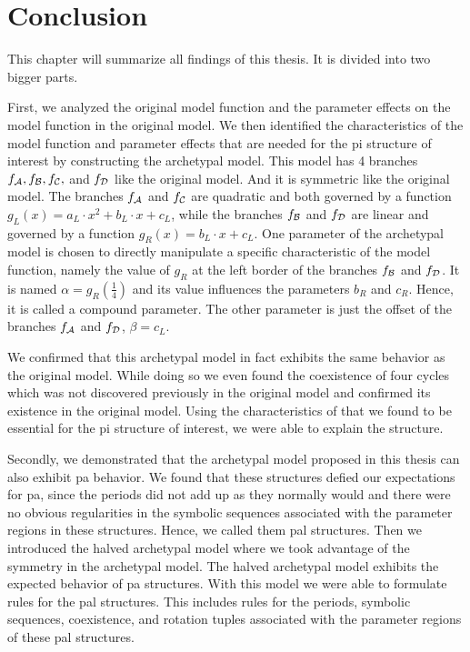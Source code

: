 \chapter{Conclusion}

This chapter will summarize all findings of this thesis.
It is divided into two bigger parts.

First, we analyzed the original model function and the parameter effects on the model function in the original model.
We then identified the characteristics of the model function and parameter effects that are needed for the \gls{pi} structure of interest by constructing the archetypal model.
This model has 4 branches $f_{\mathcal{A}}, f_{\mathcal{B}}, f_{\mathcal{C}},$ and $f_{\mathcal{D}}$ like the original model.
And it is symmetric like the original model.
The branches $f_{\mathcal{A}}$ and $f_{\mathcal{C}}$ are quadratic and both governed by a function $g_L(x) = a_L \cdot x^2 + b_L \cdot x + c_L$, while the branches $f_{\mathcal{B}}$ and $f_{\mathcal{D}}$ are linear and governed by a function $g_R(x) = b_L \cdot x + c_L$.
One parameter of the archetypal model is chosen to directly manipulate a specific characteristic of the model function, namely the value of $g_R$ at the left border of the branches $f_{\mathcal{B}}$ and $f_{\mathcal{D}}$.
It is named $\alpha = g_R\left(\frac{1}{4}\right)$ and its value influences the parameters $b_R$ and $c_R$.
Hence, it is called a compound parameter.
The other parameter is just the offset of the branches $f_{\mathcal{A}}$ and $f_{\mathcal{D}}$, $\beta = c_L$.


We confirmed that this archetypal model in fact exhibits the same behavior as the original model.
While doing so we even found the coexistence of four cycles which was not discovered previously in the original model and confirmed its existence in the original model.
Using the characteristics of that we found to be essential for the \gls{pi} structure of interest, we were able to explain the structure.

Secondly, we demonstrated that the archetypal model proposed in this thesis can also exhibit \gls{pa} behavior.
We found that these structures defied our expectations for \gls{pa}, since the periods did not add up as they normally would and there were no obvious regularities in the symbolic sequences associated with the parameter regions in these structures.
Hence, we called them \gls{pal} structures.
Then we introduced the halved archetypal model where we took advantage of the symmetry in the archetypal model.
The halved archetypal model exhibits the expected behavior of \gls{pa} structures.
With this model we were able to formulate rules for the \gls{pal} structures.
This includes rules for the periods, symbolic sequences, coexistence, and rotation tuples associated with the parameter regions of these \gls{pal} structures.


